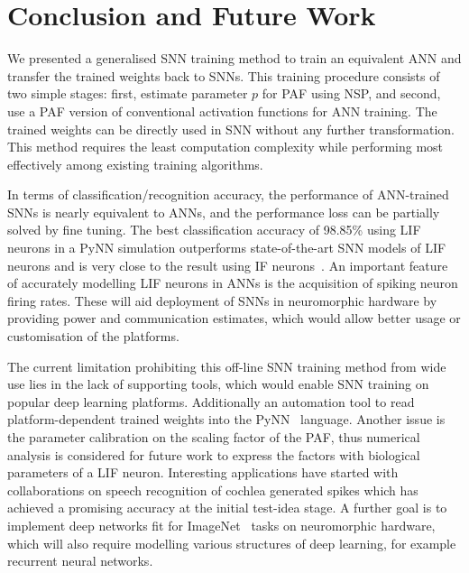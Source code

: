 \documentclass[10pt,journal,compsoc]{IEEEtran}
\begin{document}
	\section{Conclusion and Future Work}
	We presented a generalised SNN training method to train an equivalent ANN and transfer the trained weights back to SNNs.
	This training procedure consists of two simple stages: first, estimate parameter $p$ for PAF using NSP, and second, use a PAF version of conventional activation functions for ANN training. %
	The trained weights can be directly used in SNN without any further transformation.
	This method requires the least computation complexity while performing most effectively among existing training algorithms.
	
	In terms of classification/recognition accuracy, the performance of ANN-trained SNNs is nearly equivalent to ANNs, and the performance loss can be partially solved by fine tuning.
	The best classification accuracy of 98.85\% using LIF neurons in a PyNN simulation outperforms state-of-the-art SNN models of LIF neurons and is very close to the result using IF neurons~\cite{diehl2015fast}.
	An important feature of accurately modelling LIF neurons in ANNs is the acquisition of spiking neuron firing rates. These will aid deployment of SNNs in neuromorphic hardware by providing power and communication estimates, which would allow better usage or customisation of the platforms.
	
	The current limitation prohibiting this off-line SNN training method from wide use lies in the lack of supporting tools, which would enable SNN training on popular deep learning platforms. Additionally an automation tool to read platform-dependent trained weights into the PyNN~\cite{davison2008pynn} language.
	Another issue is the parameter calibration on the scaling factor of the PAF, thus numerical analysis is considered for future work to express the factors with biological parameters of a LIF neuron.
	Interesting applications have started with collaborations on speech recognition of cochlea generated spikes which has achieved a promising accuracy at the initial test-idea stage.
	A further goal is to implement deep networks fit for ImageNet~\cite{deng2009imagenet} tasks on neuromorphic hardware, which will also require modelling various structures of deep learning, for example recurrent neural networks.
	
\end{document}
